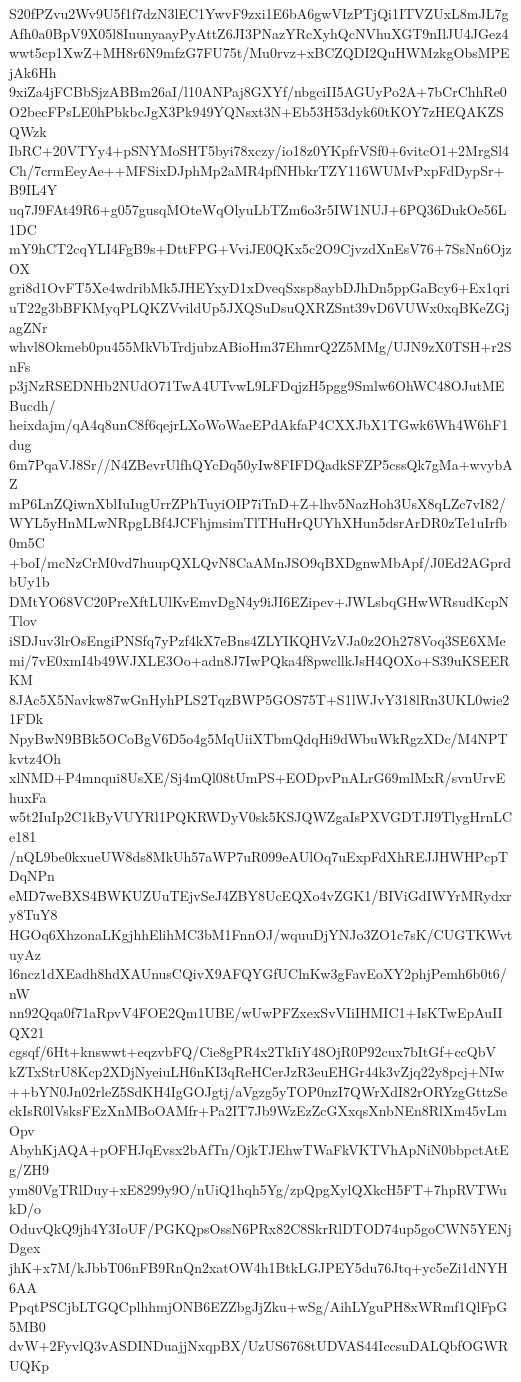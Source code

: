 S20fPZvu2Wv9U5f1f7dzN3lEC1YwvF9zxi1E6bA6gwVIzPTjQi1ITVZUxL8mJL7g
Afh0a0BpV9X05l8IuunyaayPyAttZ6JI3PNazYRcXyhQcNVhuXGT9nIlJU4JGez4
wwt5cp1XwZ+MH8r6N9mfzG7FU75t/Mu0rvz+xBCZQDI2QuHWMzkgObsMPEjAk6Hh
9xiZa4jFCBbSjzABBm26aI/l10ANPaj8GXYf/nbgciII5AGUyPo2A+7bCrChhRe0
O2becFPsLE0hPbkbcJgX3Pk949YQNsxt3N+Eb53H53dyk60tKOY7zHEQAKZSQWzk
IbRC+20VTYy4+pSNYMoSHT5byi78xczy/io18z0YKpfrVSf0+6vitcO1+2MrgSl4
Ch/7crmEeyAe++MFSixDJphMp2aMR4pfNHbkrTZY116WUMvPxpFdDypSr+B9IL4Y
uq7J9FAt49R6+g057gusqMOteWqOlyuLbTZm6o3r5IW1NUJ+6PQ36DukOe56L1DC
mY9hCT2cqYLI4FgB9s+DttFPG+VviJE0QKx5c2O9CjvzdXnEsV76+7SsNn6OjzOX
gri8d1OvFT5Xe4wdribMk5JHEYxyD1xDveqSxsp8aybDJhDn5ppGaBcy6+Ex1qri
uT22g3bBFKMyqPLQKZVvildUp5JXQSuDsuQXRZSnt39vD6VUWx0xqBKeZGjagZNr
whvl8Okmeb0pu455MkVbTrdjubzABioHm37EhmrQ2Z5MMg/UJN9zX0TSH+r2SnFs
p3jNzRSEDNHb2NUdO71TwA4UTvwL9LFDqjzH5pgg9Smlw6OhWC48OJutMEBucdh/
heixdajm/qA4q8unC8f6qejrLXoWoWaeEPdAkfaP4CXXJbX1TGwk6Wh4W6hF1dug
6m7PqaVJ8Sr//N4ZBevrUlfhQYcDq50yIw8FIFDQadkSFZP5cssQk7gMa+wvybAZ
mP6LnZQiwnXblIuIugUrrZPhTuyiOIP7iTnD+Z+lhv5NazHoh3UsX8qLZc7vI82/
WYL5yHnMLwNRpgLBf4JCFhjmsimTlTHuHrQUYhXHun5dsrArDR0zTe1uIrfb0m5C
+boI/mcNzCrM0vd7huupQXLQvN8CaAMnJSO9qBXDgnwMbApf/J0Ed2AGprdbUy1b
DMtYO68VC20PreXftLUlKvEmvDgN4y9iJI6EZipev+JWLsbqGHwWRsudKcpNTlov
iSDJuv3lrOsEngiPNSfq7yPzf4kX7eBns4ZLYIKQHVzVJa0z2Oh278Voq3SE6XMe
mi/7vE0xmI4b49WJXLE3Oo+adn8J7IwPQka4f8pwcllkJsH4QOXo+S39uKSEERKM
8JAc5X5Navkw87wGnHyhPLS2TqzBWP5GOS75T+S1lWJvY318lRn3UKL0wie21FDk
NpyBwN9BBk5OCoBgV6D5o4g5MqUiiXTbmQdqHi9dWbuWkRgzXDc/M4NPTkvtz4Oh
xlNMD+P4mnqui8UsXE/Sj4mQl08tUmPS+EODpvPnALrG69mlMxR/svnUrvEhuxFa
w5t2IuIp2C1kByVUYRl1PQKRWDyV0sk5KSJQWZgaIsPXVGDTJI9TlygHrnLCe181
/nQL9be0kxueUW8ds8MkUh57aWP7uR099eAUlOq7uExpFdXhREJJHWHPcpTDqNPn
eMD7weBXS4BWKUZUuTEjvSeJ4ZBY8UcEQXo4vZGK1/BIViGdIWYrMRydxry8TuY8
HGOq6XhzonaLKgjhhElihMC3bM1FnnOJ/wquuDjYNJo3ZO1c7sK/CUGTKWvtuyAz
l6ncz1dXEadh8hdXAUnusCQivX9AFQYGfUClnKw3gFavEoXY2phjPemh6b0t6/nW
nn92Qqa0f71aRpvV4FOE2Qm1UBE/wUwPFZxexSvVIiIHMIC1+IsKTwEpAuIIQX21
cgsqf/6Ht+knswwt+eqzvbFQ/Cie8gPR4x2TkIiY48OjR0P92cux7bItGf+ccQbV
kZTxStrU8Kcp2XDjNyeiuLH6nKI3qReHCerJzR3euEHGr44k3vZjq22y8pcj+NIw
++bYN0Jn02rleZ5SdKH4IgGOJgtj/aVgzg5yTOP0nzI7QWrXdI82rORYzgGttzSe
ckIsR0lVsksFEzXnMBoOAMfr+Pa2IT7Jb9WzEzZcGXxqsXnbNEn8RlXm45vLmOpv
AbyhKjAQA+pOFHJqEvsx2bAfTn/OjkTJEhwTWaFkVKTVhApNiN0bbpctAtEg/ZH9
ym80VgTRlDuy+xE8299y9O/nUiQ1hqh5Yg/zpQpgXylQXkcH5FT+7hpRVTWukD/o
OduvQkQ9jh4Y3IoUF/PGKQpsOssN6PRx82C8SkrRlDTOD74up5goCWN5YENjDgex
jhK+x7M/kJbbT06nFB9RnQn2xatOW4h1BtkLGJPEY5du76Jtq+yc5eZi1dNYH6AA
PpqtPSCjbLTGQCplhhmjONB6EZZbgJjZku+wSg/AihLYguPH8xWRmf1QlFpG5MB0
dvW+2FyvlQ3vASDINDuajjNxqpBX/UzUS6768tUDVAS44IccsuDALQbfOGWRUQKp
